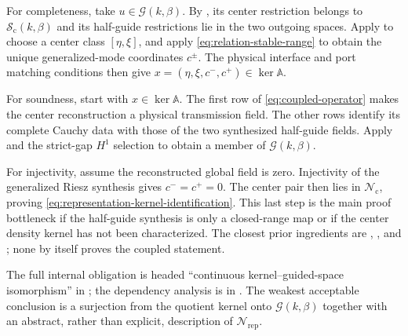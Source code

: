 \begin{proofroadmap}
For completeness, take $u\in\mathcal G(k,\beta)$.  By
, its center restriction belongs to
$\mathcal S_{\mathrm c}(k,\beta)$ and its half-guide restrictions lie in the two
outgoing spaces.  Apply  to choose a center
class $[\eta,\xi]$, and apply \eqref{eq:relation-stable-range} to obtain the
unique generalized-mode coordinates $c^\pm$.  The physical interface and port
matching conditions then give $x=(\eta,\xi,c^-,c^+)\in\ker\mathbb A$.

For soundness, start with $x\in\ker\mathbb A$.  The first row of
\eqref{eq:coupled-operator} makes the center reconstruction a physical
transmission field.  The other rows identify its complete Cauchy data with
those of the two synthesized half-guide fields.  Apply
 and the strict-gap $H^1$ selection to obtain a member of
$\mathcal G(k,\beta)$.

For injectivity, assume the reconstructed global field is zero.  Injectivity
of the generalized Riesz synthesis gives $c^-=c^+=0$.  The center pair then
lies in $\mathcal N_{\mathrm c}$, proving
\eqref{eq:representation-kernel-identification}.  This last step is the main
proof bottleneck if the half-guide synthesis is only a closed-range map or if the
center density kernel has not been characterized.  The closest prior
ingredients are \cite[Theorem~4.5]{Fliss2013},
\cite[Theorem~4 and Appendix~A]{BarnettGreengard2010}, and
\cite[Theorem~2.2]{HohageSoussi2013}; none by itself proves the coupled
statement.

The full internal obligation is headed ``continuous kernel--guided-space
isomorphism'' in
; the dependency
analysis is in
.  The
weakest acceptable conclusion is a surjection from the quotient kernel onto
$\mathcal G(k,\beta)$ together with an abstract, rather than explicit,
description of $\mathcal N_{\mathrm{rep}}$.
\end{proofroadmap}
